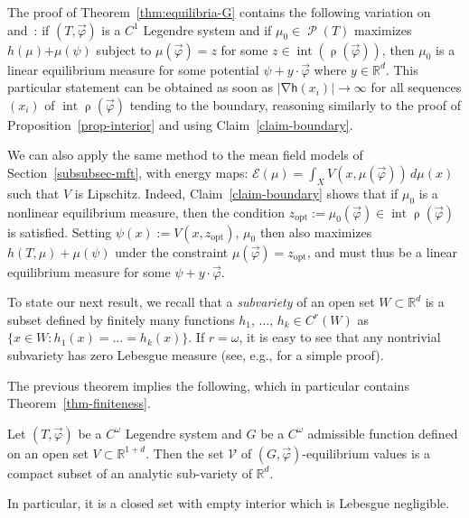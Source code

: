 \documentclass[AHL, Unicode, longabstracts,published]{cedram}
\theoremstyle{plain}
\theoremstyle{plain}
\newcommand\vpot{\vec\pot}
\newcommand\inter{\operatorname{int}}
\newcommand\Prob{{\operatorname{\mathscr{P}}}}
\newcommand{\rs}{\operatorname{\rho}}
\newcommand{\grad}{\operatorname{\nabla}}
\newcommand{\opt}{\mathrm{opt}}
\newcommand{\hf}{\mathsf{h}}
\newcommand{\pot}{\varphi}
\newcounter{In}
\newcommand*\8{\infty}
\newcommand\RR{\mathbb{R}}
\newcommand{\En}{\mathcal{E}}
\newcommand{\scV}{\mathscr{V}}
\begin{document}
\begin{rema}\label{rem-max-ent-cond}
The proof of Theorem~\ref{thm:equilibria-G} contains the following variation on~\cite[Theorem~B]{KW2015} and~\cite[Theorem~G]{GKLM}: if $(T,\vec\pot)$ is a $C^1$ Legendre system and if $\mu_{0}\in\Prob(T)$ maximizes $h(\mu) { +\mu(\psi)}$ subject to $\mu(\vec\pot)=z$ for some $z\in\inter(\rs(\vec\pot))$, then $\mu_0$ is a linear equilibrium measure for some potential $\psi+y\cdot \vec\varphi$ where $y\in\RR^d$. This particular statement can be obtained as soon as $\lvert \grad \hf(x_i)\rvert\to\infty$ for all sequences $(x_i)$ of $\inter\rs(\vec \varphi)$ tending to the boundary, reasoning similarly to the proof of Proposition~\ref{prop-interior} and using Claim~\ref{claim-boundary}.
\end{rema}

\begin{rema}
We can also apply the same method to the mean field models of Section~\ref{subsubsec-mft}, with energy maps: $\En(\mu)=\int_X V(x,\mu(\vec\pot))\, d\mu(x)$ such that $V$ is Lipschitz. Indeed, Claim~\ref{claim-boundary} shows that if $\mu_0$ is a nonlinear equilibrium measure, then the condition $z_{\opt}:=\mu_{ 0}(\vec\pot)\in\inter\rs(\vec\pot)$ is satisfied. Setting $\psi(x):=V(x,z_{\opt})$, $\mu_0$ then also maximizes $h(T,\mu)+\mu(\psi)$ under the constraint $\mu(\vec \varphi)=z_{\opt}$, and must thus be a linear equilibrium measure for some $\psi+y\cdot \vec \varphi$.
\end{rema}

To state our next result, we recall that a \emph{subvariety} of an open set $W\subset\RR^d$ is a subset defined by finitely many functions $h_1,\,\dots,\,h_k\in C^r(W)$ as $\{x\in W: h_1(x)=\dots=h_k(x)\}$. If $r=\omega$, it is easy to see that any nontrivial subvariety has zero Lebesgue measure (see, e.g., \cite{Mityagin} for a simple proof).


The previous theorem implies the following, which in particular contains Theorem~\ref{thm-finiteness}.

\begin{coro}
Let $(T, \vpot)$ be a $C^\omega$ Legendre system and $G$ be a $C^\omega$ admissible function defined on an open set $V\subset \RR^{1+d}$. Then the set $\scV$ of $(G,\vpot)$-equilibrium values is a compact subset of an analytic sub-variety of $\RR^d$.

In particular, it is a closed set with empty interior which is Lebesgue negligible.
\end{coro}
\end{document}

